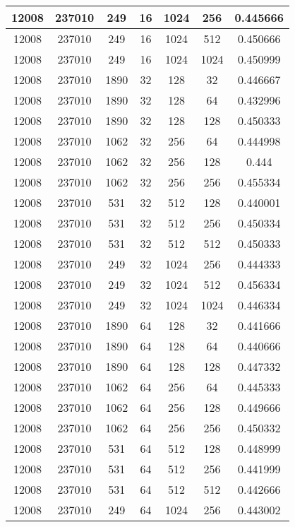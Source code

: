 \documentclass[9pt]{article}
\begin{document}
\begin{tabular}{|c|c|c|c|c|c|c| }
\hline
12008  & 237010  & 249  & 16  & 1024  & 256  & 0.445666 \\
\hline
12008  & 237010  & 249  & 16  & 1024  & 512  & 0.450666 \\
\hline
12008  & 237010  & 249  & 16  & 1024  & 1024  & 0.450999 \\
\hline
12008  & 237010  & 1890  & 32  & 128  & 32  & 0.446667 \\
\hline
12008  & 237010  & 1890  & 32  & 128  & 64  & 0.432996 \\
\hline
12008  & 237010  & 1890  & 32  & 128  & 128  & 0.450333 \\
\hline
12008  & 237010  & 1062  & 32  & 256  & 64  & 0.444998 \\
\hline
12008  & 237010  & 1062  & 32  & 256  & 128  & 0.444 \\
\hline
12008  & 237010  & 1062  & 32  & 256  & 256  & 0.455334 \\
\hline
12008  & 237010  & 531  & 32  & 512  & 128  & 0.440001 \\
\hline
12008  & 237010  & 531  & 32  & 512  & 256  & 0.450334 \\
\hline
12008  & 237010  & 531  & 32  & 512  & 512  & 0.450333 \\
\hline
12008  & 237010  & 249  & 32  & 1024  & 256  & 0.444333 \\
\hline
12008  & 237010  & 249  & 32  & 1024  & 512  & 0.456334 \\
\hline
12008  & 237010  & 249  & 32  & 1024  & 1024  & 0.446334 \\
\hline
12008  & 237010  & 1890  & 64  & 128  & 32  & 0.441666 \\
\hline
12008  & 237010  & 1890  & 64  & 128  & 64  & 0.440666 \\
\hline
12008  & 237010  & 1890  & 64  & 128  & 128  & 0.447332 \\
\hline
12008  & 237010  & 1062  & 64  & 256  & 64  & 0.445333 \\
\hline
12008  & 237010  & 1062  & 64  & 256  & 128  & 0.449666 \\
\hline
12008  & 237010  & 1062  & 64  & 256  & 256  & 0.450332 \\
\hline
12008  & 237010  & 531  & 64  & 512  & 128  & 0.448999 \\
\hline
12008  & 237010  & 531  & 64  & 512  & 256  & 0.441999 \\
\hline
12008  & 237010  & 531  & 64  & 512  & 512  & 0.442666 \\
\hline
12008  & 237010  & 249  & 64  & 1024  & 256  & 0.443002 \\

\end{tabular}
\end{document}
